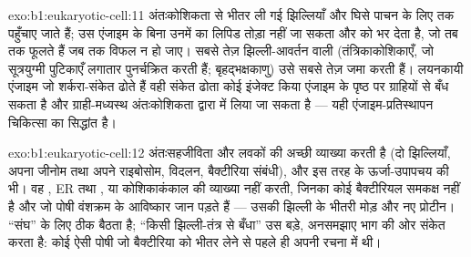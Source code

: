 \begin{solution}{exo:b1:eukaryotic-cell:11}
अंतःकोशिकता से भीतर ली गई झिल्लियाँ और घिसे  पाचन के लिए  तक
पहुँचाए जाते हैं; उस एंजाइम के बिना उनमें का लिपिड तोड़ा नहीं जा सकता और
 को भर देता है, जो तब तक फूलते हैं जब तक  विफल न हो जाए।
सबसे तेज़ झिल्ली-आवर्तन वाली  (तंत्रिकाकोशिकाएँ, जो सूत्रयुग्मी
पुटिकाएँ लगातार पुनर्चक्रित करती हैं; बृहद्भक्षकाणु) उसे सबसे तेज़ जमा
करती हैं। लयनकायी एंजाइम जो शर्करा-संकेत ढोते हैं वही संकेत ढोता कोई
इंजेक्ट किया एंजाइम  के पृष्ठ पर ग्राहियों से बँध सकता है और
ग्राही-मध्यस्थ अंतःकोशिकता द्वारा  में लिया जा सकता है --- यही
एंजाइम-प्रतिस्थापन चिकित्सा का सिद्धांत है।
\end{solution}

\begin{solution}{exo:b1:eukaryotic-cell:12}
अंतःसहजीविता  और लवकों की अच्छी व्याख्या करती है (दो
झिल्लियाँ, अपना जीनोम तथा अपने राइबोसोम, विदलन, बैक्टीरिया संबंधी), और इस
तरह  के ऊर्जा-उपापचय की भी। वह , ER तथा , या
कोशिकाकंकाल की व्याख्या नहीं करती, जिनका कोई बैक्टीरियल समकक्ष नहीं है और
जो पोषी वंशक्रम के आविष्कार जान पड़ते हैं --- उसकी झिल्ली के भीतरी मोड़ और
नए प्रोटीन। ``संघ''  के लिए ठीक बैठता है; ``किसी झिल्ली-तंत्र से बँधा''
उस बड़े, अनसमझाए भाग की ओर संकेत करता है: कोई ऐसी पोषी  जो
बैक्टीरिया को भीतर लेने से पहले ही अपनी रचना में  थी।
\end{solution}

